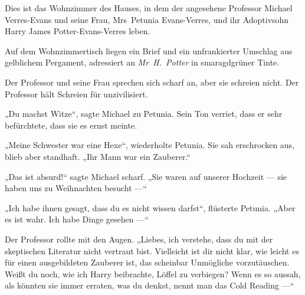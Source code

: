 Dies ist das Wohnzimmer des Hauses, in dem der angesehene Professor Michael Verres-Evans und seine Frau, Mrs~Petunia Evans-Verres, und ihr Adoptivsohn Harry James Potter-Evans-Verres leben.

Auf dem Wohnzimmertisch liegen ein Brief und ein unfrankierter Umschlag aus gelblichem Pergament, adressiert an \emph{Mr~H.~Potter} in smaragdgrüner Tinte.

Der Professor und seine Frau sprechen sich scharf an, aber sie schreien nicht. Der Professor hält Schreien für unzivilisiert.

„Du machst Witze“, sagte Michael zu Petunia. Sein Ton verriet, dass er sehr befürchtete, dass sie es ernst meinte.

„Meine Schwester war eine Hexe“, wiederholte Petunia. Sie sah erschrocken aus, blieb aber standhaft. „Ihr Mann war ein Zauberer.“

„Das ist absurd!“ sagte Michael scharf. „Sie waren auf unserer Hochzeit — sie haben uns zu Weihnachten besucht —“

„Ich habe ihnen gesagt, dass du es nicht wissen darfst“, flüsterte Petunia. „Aber es ist wahr. Ich habe Dinge gesehen —“

Der Professor rollte mit den Augen. „Liebes, ich verstehe, dass du mit der skeptischen Literatur nicht vertraut bist. Vielleicht ist dir nicht klar, wie leicht es für einen ausgebildeten Zauberer ist, das scheinbar Unmögliche vorzutäuschen. Weißt du noch, wie ich Harry beibrachte, Löffel zu verbiegen? Wenn es so aussah, als könnten sie immer erraten, was du denkst, nennt man das Cold Reading —“

